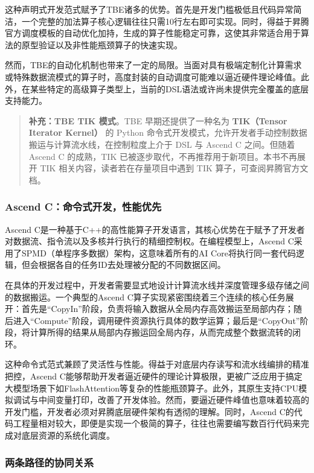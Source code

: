 这种声明式开发范式赋予了TBE诸多的优势。首先是开发门槛极低且代码异常简洁，一个完整的加法算子核心逻辑往往只需10行左右即可实现。同时，得益于昇腾官方调度模板的自动优化加持，生成的算子性能稳定可靠，这使其非常适合用于算法的原型验证以及非性能瓶颈算子的快速实现。

然而，TBE的自动化机制也带来了一定的局限。当面对具有极端定制化计算需求或特殊数据流模式的算子时，高度封装的自动调度可能难以逼近硬件理论峰值。此外，在某些特定的高级算子类型上，当前的DSL语法或许尚未提供完全覆盖的底层支持能力。

\begin{quote}
\textbf{补充：TBE TIK 模式}。TBE 早期还提供了一种名为
\textbf{TIK（Tensor Iterator Kernel）} 的 Python
命令式开发模式，允许开发者手动控制数据搬运与计算流水线，在控制粒度上介于
DSL 与 Ascend C 之间。但随着 Ascend C 的成熟，TIK
已被逐步取代，不再推荐用于新项目。本书不再展开 TIK
相关内容，读者若在存量项目中遇到 TIK 算子，可查阅昇腾官方文档。
\end{quote}

\subsubsection{Ascend
C：命令式开发，性能优先}\label{src-book-chapter7-h8}

Ascend
C是一种基于C++的高性能算子开发语言，其核心优势在于赋予了开发者对数据流、指令流以及多核并行执行的精细控制权。在编程模型上，Ascend
C采用了SPMD（单程序多数据）架构，这意味着所有的AI
Core将执行同一套代码逻辑，但会根据各自的任务ID去处理被分配的不同数据区间。

在具体的开发过程中，开发者需要显式地设计计算流水线并深度管理多级存储之间的数据搬运。一个典型的Ascend
C算子实现紧密围绕着三个连续的核心任务展开：首先是``CopyIn''阶段，负责将输入数据从全局内存高效搬运至局部内存；随后进入``Compute''阶段，调用硬件资源执行具体的数学运算；最后是``CopyOut''阶段，将计算所得的结果从局部内存搬运回全局内存，从而完成整个数据流转的闭环。

这种命令式范式兼顾了灵活性与性能。得益于对底层内存读写和流水线编排的精准把控，Ascend
C能够帮助开发者逼近硬件的理论计算极限，更被广泛应用于搞定大模型场景下如FlashAttention等复杂的性能瓶颈算子。此外，其原生支持CPU模拟调试与中间变量打印，改善了开发体验。然而，要逼近硬件峰值也意味着较高的开发门槛，开发者必须对昇腾底层硬件架构有透彻的理解。同时，Ascend
C的代码工程量相对较大，即便是实现一个极简的算子，往往也需要编写数百行代码来完成对底层资源的系统化调度。

\subsubsection{两条路径的协同关系}\label{src-book-chapter7-h9}

